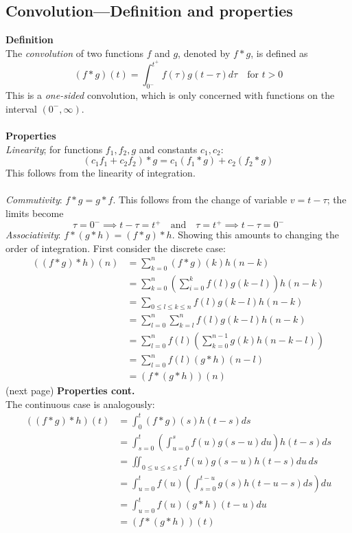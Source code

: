 \documentclass{report}
\begin{document}
\subsection{Convolution---Definition and properties}
\textbf{Definition}\\
The \textit{convolution} of two functions $f$ and $g$,
denoted by $f*g$, is defined as
\begin{equation*}
(f*g)(t)=\int^{t^+}_{0^-}f(\tau)g(t-\tau)d\tau\quad\text{for }t>0
\end{equation*}
This is a \textit{one-sided} convolution, which is only concerned with functions on the interval $(0^-,\infty)$.\\
\vspace{1mm}\\
\textbf{Properties}\\
\textit{Linearity}; for functions $f_1,f_2,g$ and constants $c_1,c_2$:
\begin{equation*}
(c_1f_1+c_2f_2)*g=c_1(f_1*g)+c_2(f_2*g)
\end{equation*}
This follows from the linearity of integration.\\
\vspace{1mm}\\
\textit{Commutivity}: $f*g=g*f$. This follows from the change of variable $v=t-\tau$; the limits become
\begin{equation*}
\tau=0^-\implies t-\tau=t^+\quad\text{and}\quad\tau=t^+\implies t-\tau=0^-
\end{equation*}
\textit{Associativity}: $f*(g*h)=(f*g)*h$. Showing this amounts to changing the order of integration. 
First consider the discrete case:
\begin{align*}
((f*g)*h)(n)&=\sum^n_{k=0}(f*g)(k)h(n-k)\\
&=\sum^n_{k=0}\left(\sum^k_{i=0}f(l)g(k-l)\right)h(n-k)\\
&=\sum_{0\leq l\leq k\leq n}f(l)g(k-l)h(n-k)\\
&=\sum^n_{l=0}\sum^n_{k=l}f(l)g(k-l)h(n-k)\\
&=\sum^n_{l=0}f(l)\left(\sum^{n-1}_{k=0}g(k)h(n-k-l)\right)\\
&=\sum^n_{l=0}f(l)(g*h)(n-l)\\
&=(f*(g*h))(n)
\end{align*}
(next page)\newpage
\noindent\textbf{Properties cont.}\\
The continuous case is analogously:
\begin{align*}
((f*g)*h)(t)&=\int^t_0(f*g)(s)h(t-s)ds\\
&=\int^t_{s=0}\left(\int^s_{u=0}f(u)g(s-u)du\right)h(t-s)ds\\
&=\iint_{0\leq u\leq s\leq t} f(u)g(s-u)h(t-s)du\,ds\\
&=\int^t_{u=0}f(u)\left(\int^{t-u}_{s=0}g(s)h(t-u-s)ds\right)du\\
&=\int^t_{u=0}f(u)(g*h)(t-u)du\\
&=(f*(g*h))(t)
\end{align*}
\end{document}
